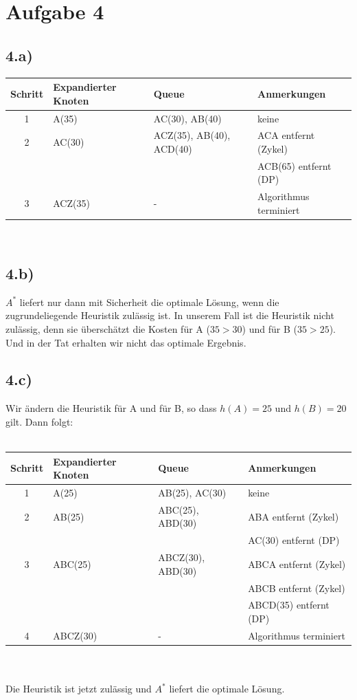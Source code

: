 \documentclass[a4paper]{article}
\begin{document}
\section*{Aufgabe 4}

\subsection*{4.a)}
\begin{tabular}{|c | l | l |l |}
\hline
  Schritt & Expandierter Knoten & Queue & Anmerkungen\\
\hline
\hline
1 &  A(35)   & AC(30), AB(40)           & keine\\
\hline
2 &  AC(30)  & ACZ(35), AB(40), ACD(40) & ACA entfernt (Zykel)\\
  &          &                          & ACB(65) entfernt (DP)\\
\hline
3 &  ACZ(35) & -                        & Algorithmus terminiert\\
\hline
\end{tabular}\\ 

\subsection*{4.b)}
$A^\ast$ liefert nur dann mit Sicherheit die optimale L\"osung, wenn die zugrundeliegende Heuristik zul\"assig ist. In unserem Fall ist die Heuristik nicht zul\"assig, denn sie \"ubersch\"atzt die Kosten f\"ur A ($35>30$) und f\"ur B ($35>25$). Und in der Tat erhalten wir nicht das optimale Ergebnis.

\subsection*{4.c)}
Wir \"andern die Heuristik f\"ur A und f\"ur B, so dass $h(A)=25$ und $h(B)=20$ gilt. Dann folgt:\\
\\
\begin{tabular}{|c | l | l |l |}
\hline
  Schritt & Expandierter Knoten & Queue & Anmerkungen\\
\hline
\hline
1 & A(25)    & AB(25), AC(30)    & keine\\
\hline
2 & AB(25)   & ABC(25), ABD(30)  & ABA entfernt (Zykel)\\
  &          &                   & AC(30) entfernt (DP)\\
\hline
3 & ABC(25)  & ABCZ(30), ABD(30) & ABCA entfernt (Zykel)\\
  &          &                   & ABCB entfernt (Zykel)\\
  &          &                   & ABCD(35) entfernt (DP)\\
\hline
4 & ABCZ(30) & -                 & Algorithmus terminiert\\
\hline
\end{tabular}\\
\vspace{10pt}\\
Die Heuristik ist jetzt zul\"assig und $A^\ast$ liefert die optimale L\"osung.
\end{document}
